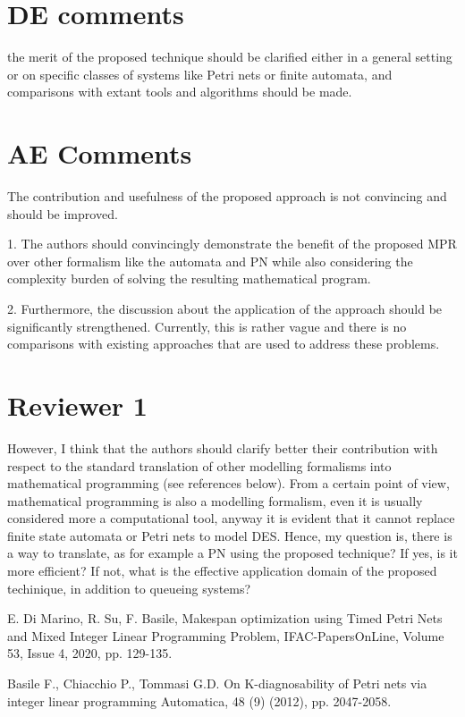 \documentclass[suppldata]{interact}
\begin{document}
\section{DE comments}
the merit of the proposed technique should be clarified either in a general setting or on specific classes of systems like Petri nets or finite automata, and comparisons with extant tools and algorithms should be made.


\section{AE Comments}
The contribution and usefulness of the proposed approach is not convincing and should be improved. 

1. The authors should convincingly demonstrate the benefit of the proposed MPR over other formalism like the automata and PN while also considering the complexity burden of solving the resulting mathematical program. 

2. Furthermore, the discussion about the application of the approach should be significantly strengthened. Currently, this is rather vague and there is no comparisons with existing approaches that are used to address these problems.


\section{Reviewer 1}
However, I think that the authors should clarify better their contribution with respect to the standard translation of other modelling formalisms into mathematical programming (see references below). From a certain point of view, mathematical programming is also a modelling formalism, even it is usually considered more a computational tool, anyway it is evident that it cannot replace finite state automata or Petri nets to model DES. Hence, my question is, there is a way to translate, as for example a PN using the proposed technique? If yes, is it more efficient? If not, what is the effective application domain of the proposed techinique, in addition to queueing systems?


E. Di Marino, R. Su, F. Basile,
Makespan optimization using Timed Petri Nets and Mixed Integer Linear Programming Problem,
IFAC-PapersOnLine, Volume 53, Issue 4, 2020, pp. 129-135.

Basile F., Chiacchio P., Tommasi G.D.
On K-diagnosability of Petri nets via integer linear programming
Automatica, 48 (9) (2012), pp. 2047-2058.
\end{document}

